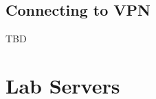 \documentclass[oneside,11pt]{book}
\begin{document}
\section{Connecting to VPN}
TBD


\chapter{Lab Servers}


\end{document}

